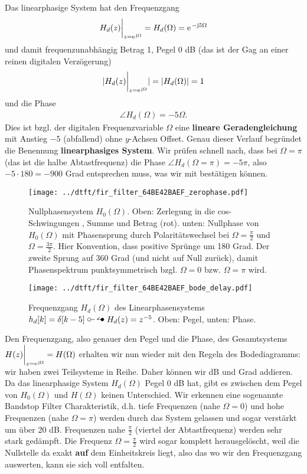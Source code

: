 Das linearphasige System hat den Frequenzgang
\begin{align}
H_d(z)\bigg|_{z=\e^{\im\Omega}} = H_d(\Omega) = \e^{-\im 5 \Omega}
\end{align}
und damit frequenzunabhängig Betrag 1, Pegel 0 dB
(das ist der Gag an einer reinen digitalen Verzögerung)
\begin{align}
|H_d(z)\bigg|_{z=\e^{\im\Omega}}| = |H_d(\Omega)| = 1
\end{align}
und die Phase
\begin{align}
\angle H_d(\Omega) = -5 \Omega.
\end{align}
Dies ist bzgl. der digitalen Frequenzvariable $\Omega$ eine \textbf{lineare
Geradengleichung} mit Anstieg $-5$ (abfallend) ohne $y$-Achsen Offset.
Genau dieser Verlauf begründet die Benennung \textbf{linearphasiges System}.
Wir prüfen schnell nach, dass bei $\Omega=\pi$ (das ist die halbe Abtastfrequenz)
die Phase $\angle H_d(\Omega=\pi) = - 5\pi$, also $-5 \cdot 180=-900$ Grad entsprechen muss,
was wir mit  bestätigen können.
%
\begin{figure}
\centering
\texttt{[image: ../dtft/fir\_filter\_64BE42BAEF\_zerophase.pdf]}
\caption{Nullphasensystem $H_0(\Omega)$.
Oben: Zerlegung in die cos-Schwingungen , Summe und Betrag (rot).
unten: Nullphase von $H_0(\Omega)$ mit
Phasensprung durch Polaritätswechsel bei $\Omega=\frac{\pi}{2}$ und $\Omega=\frac{3\pi}{2}$.
Hier Konvention, dass positive Sprünge um 180 Grad. Der zweite Sprung auf 360 Grad
(und nicht auf Null zurück), damit Phasenspektrum punktsymmetrisch bzgl.
$\Omega=0$ bzw. $\Omega=\pi$ wird.
}
\label{fig:fir_filter_64BE42BAEF_zerophase}
\end{figure}
%
\begin{figure}
\centering
\texttt{[image: ../dtft/fir\_filter\_64BE42BAEF\_bode\_delay.pdf]}
\caption{Frequenzgang $H_d(\Omega)$ des Linearphasensystems
$h_d[k]=\delta[k-5] \ztransf H_d(z)=z^{-5}$. Oben: Pegel, unten: Phase.}
\label{fig:fir_filter_64BE42BAEF_bode_delay}
\end{figure}
%

Den Frequenzgang, also genauer den Pegel und die Phase, des
Gesamtsystems $H(z)\bigg|_{z=\e^{\im\Omega}} = H(\Omega)$
erhalten wir nun wieder mit den Regeln des Bodediagramms:
wir haben zwei Teilsysteme in Reihe. Daher können wir dB und Grad addieren.
Da das linearphasige System $H_d(\Omega)$ Pegel 0 dB hat, gibt es zwischen
dem Pegel von $H_0(\Omega)$ und $H(\Omega)$ keinen Unterschied.
Wir erkennen eine sogenannte Bandstop Filter Charakteristik, d.h. tiefe Frequenzen
(nahe $\Omega=0$) und hohe Frequenzen (nahe $\Omega=\pi$) werden durch das System
gelassen und sogar verstärkt um über 20 dB. Frequenzen nahe $\frac{\pi}{2}$ (viertel
der Abtastfrequenz) werden sehr stark gedämpft. Die Frequenz $\Omega=\frac{\pi}{2}$
wird sogar komplett herausgelöscht, weil die Nullstelle da exakt \textbf{auf}
dem Einheitskreis liegt, also das wo wir den Frequenzgang auswerten, kann sie sich
voll entfalten.

